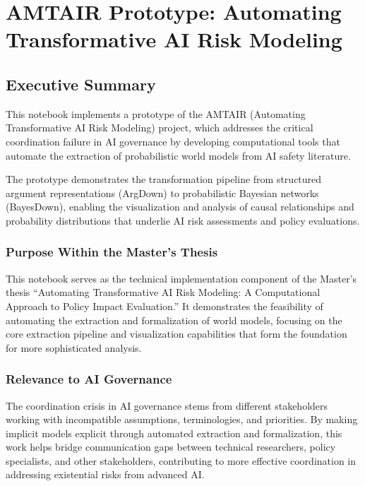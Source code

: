 \documentclass[
  11pt,
  letterpaper,
]{book}
\begin{document}
\chapter{AMTAIR Prototype: Automating Transformative AI Risk
Modeling}\label{amtair-prototype-automating-transformative-ai-risk-modeling}

\section{Executive Summary}\label{executive-summary}

This notebook implements a prototype of the AMTAIR (Automating
Transformative AI Risk Modeling) project, which addresses the critical
coordination failure in AI governance by developing computational tools
that automate the extraction of probabilistic world models from AI
safety literature.

The prototype demonstrates the transformation pipeline from structured
argument representations (ArgDown) to probabilistic Bayesian networks
(BayesDown), enabling the visualization and analysis of causal
relationships and probability distributions that underlie AI risk
assessments and policy evaluations.

\subsection{Purpose Within the Master's
Thesis}\label{purpose-within-the-masters-thesis}

This notebook serves as the technical implementation component of the
Master's thesis ``Automating Transformative AI Risk Modeling: A
Computational Approach to Policy Impact Evaluation.'' It demonstrates
the feasibility of automating the extraction and formalization of world
models, focusing on the core extraction pipeline and visualization
capabilities that form the foundation for more sophisticated analysis.

\subsection{Relevance to AI
Governance}\label{relevance-to-ai-governance}

The coordination crisis in AI governance stems from different
stakeholders working with incompatible assumptions, terminologies, and
priorities. By making implicit models explicit through automated
extraction and formalization, this work helps bridge communication gaps
between technical researchers, policy specialists, and other
stakeholders, contributing to more effective coordination in addressing
existential risks from advanced AI.
\end{document}
